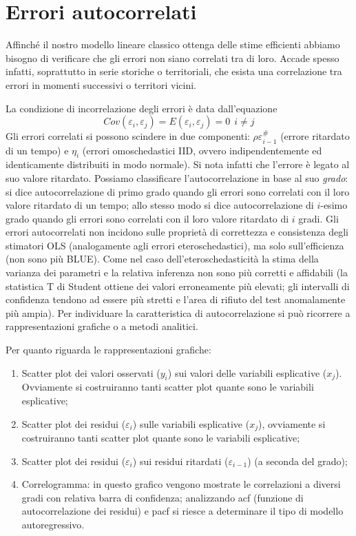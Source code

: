 \documentclass[a4page, 11pt]{article} %
\begin{document}
\section{Errori autocorrelati}

Affinché il nostro modello lineare classico ottenga delle stime efficienti abbiamo bisogno di verificare che gli errori non siano correlati tra di loro.
Accade spesso infatti, soprattutto in serie storiche o territoriali, che esista una correlazione tra errori in momenti successivi o territori vicini. 

La condizione di incorrelazione degli errori è data dall'equazione
\[
Cov(\varepsilon_i,\varepsilon_j) = E(\varepsilon_i,\varepsilon_j) = 0 \ \ 
i \not = j
\]
Gli errori correlati si possono scindere in due componenti: $\rho \varepsilon_{i-1}^{\#}$ (errore ritardato di un tempo) e $\eta_i$ (errori omoschedastici IID, ovvero indipendentemente ed identicamente distribuiti in modo normale).
Si nota infatti che l’errore è legato al suo valore ritardato.
Possiamo classificare l’autocorrelazione in base al suo \textit{grado}: si dice autocorrelazione di primo grado quando gli errori sono correlati con il loro valore ritardato di un tempo; allo stesso modo si dice autocorrelazione di $i$-esimo grado quando gli errori sono correlati con il loro valore ritardato di $i$ gradi. Gli errori autocorrelati non incidono sulle proprietà di correttezza e consistenza degli stimatori OLS (analogamente agli errori eteroschedastici), ma solo sull’efficienza (non sono più BLUE). Come nel caso dell’eteroschedasticità la stima della varianza dei parametri e la relativa inferenza non sono più corretti e affidabili (la statistica T di Student ottiene dei valori erroneamente più elevati; gli intervalli di confidenza tendono ad essere più stretti e l'area di rifiuto del test anomalamente più ampia).
Per individuare la caratteristica di autocorrelazione si può ricorrere a rappresentazioni grafiche o a metodi analitici.

Per quanto riguarda le rappresentazioni grafiche:
\begin{enumerate}[noitemsep]
\item Scatter plot dei valori osservati ($y_i$) sui valori delle variabili esplicative ($x_j$). Ovviamente si costruiranno tanti scatter plot quante sono le variabili esplicative;
\item Scatter plot dei residui ($\varepsilon_i$) sulle variabili esplicative ($x_j$), ovviamente si costruiranno tanti scatter plot quante sono le variabili esplicative;
\item Scatter plot dei residui ($\varepsilon_i$) sui residui ritardati ($\varepsilon_{i-1}$) (a seconda del grado);
\item Correlogramma: in questo grafico vengono mostrate le correlazioni a diversi gradi con relativa barra di confidenza; analizzando acf (funzione di autocorrelazione dei residui) e pacf si riesce a determinare il tipo di modello autoregressivo.\end{enumerate}
\end{document}
